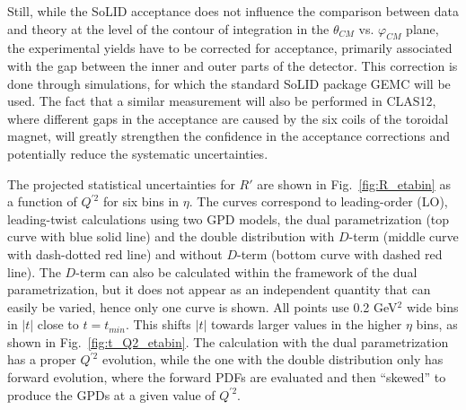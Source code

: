 Still, while the SoLID acceptance does not influence the comparison between
data and theory at the level of the contour of integration in the
$\theta_{CM}$ vs. $\varphi_{CM}$ plane, the experimental yields have to be
corrected for acceptance, primarily associated with the gap between the inner
and outer parts of the detector. This correction is done through simulations,
for which the standard SoLID package GEMC will be used. The fact that a
similar measurement will also be performed in CLAS12, where different gaps in
the acceptance are caused by the six coils of the toroidal magnet, will
greatly strengthen the confidence in the acceptance corrections and
potentially reduce the systematic uncertainties.

The projected statistical uncertainties for $R'$ are shown in
Fig.~\ref{fig:R_etabin} as a function of $Q^{\prime 2}$ for six bins in
$\eta$. The curves correspond to leading-order (LO), leading-twist
calculations using two GPD models, the dual parametrization
\cite{Polyakov:2002wz,Guzey:2006xi,Guzey:2008ys,Polyakov:2008aa} (top curve
with blue solid line) and the double distribution \cite{Radyushkin:1998es}
with $D$-term (middle curve with dash-dotted red line) and without $D$-term
(bottom curve with dashed red line). The $D$-term can also be calculated
within the framework of the dual parametrization, but it does not appear as
an independent quantity that can easily be varied, hence only one curve is
shown.
All points use 0.2 GeV$^2$ wide bins in $|t|$ close to $t=t_{min}$. This
shifts $|t|$ towards larger values in the higher $\eta$ bins, as shown in
Fig.~\ref{fig:t_Q2_etabin}.
The calculation with the dual parametrization has a proper $Q^{\prime 2}$
evolution, while the one with the double distribution only has forward
evolution, where the forward PDFs are evaluated and then ``skewed'' to
produce the GPDs at a given value of $Q^{\prime 2}$.


